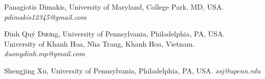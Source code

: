 \documentclass[twoside, 11pt]{article}
\numberwithin{equation}{section}
\theoremstyle{theorem}
\numberwithin{theorem}{section}
\theoremstyle{definition}
\newcommand\dqd{\foreignlanguage{vietnamese}{Đinh Quý Dương}}
\begin{document}
\printbibliography

\vspace{7pt}
\noindent
Panagiotis Dimakis, University of Maryland, College Park, MD, USA.
\textit{pdimakis12345@gmail.com}

\vspace{7pt}
\noindent 
\dqd, University of Pennsylvania, Philadelphia, PA, USA. \\
University of Khanh Hoa, Nha Trang, Khanh Hoa, Vietnam.
\textit{duongdinh.mp@gmail.com}

\vspace{7pt}
\noindent
Shengjing Xu, University of Pennsylvania, Philadelphia, PA, USA. 
\textit{xsj@upenn.edu}
\end{document}
